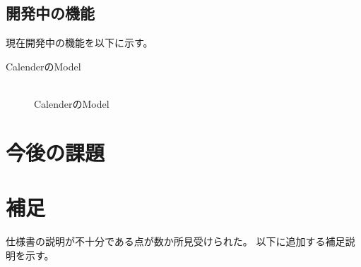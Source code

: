 \documentclass[a4j]{jarticle}
\begin{document}
\subsection{開発中の機能}
現在開発中の機能を以下に示す。
\begin{description}
	\item[CalenderのModel] \mbox{} \\
		CalenderのModel
\end{description}


\section{今後の課題}



\section{補足}
仕様書の説明が不十分である点が数か所見受けられた。
以下に追加する補足説明を示す。
\end{document}
